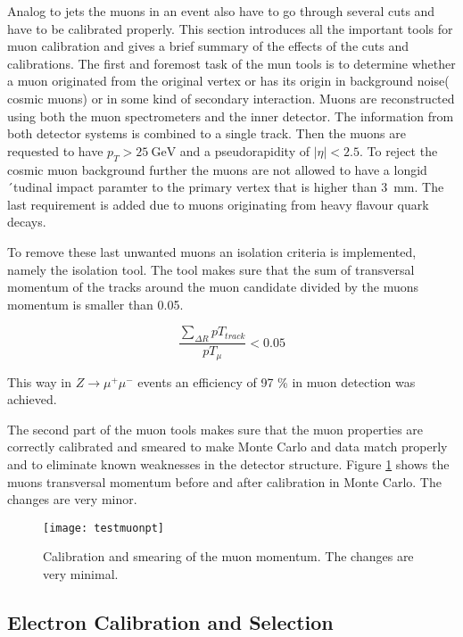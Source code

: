 Analog to jets the muons in an event also have to go through several cuts and have to be calibrated properly. This section introduces all the important tools for muon calibration and gives a brief summary of the effects of the cuts and calibrations.
The first and foremost task of the mun tools is to determine whether a muon originated from the original vertex or has its origin in background noise( cosmic muons) or in some kind of secondary interaction. Muons are reconstructed using both the muon spectrometers and the inner detector. The information from both detector systems is combined to a single track. Then the muons are requested to have $p_T > \SI{25}{\GeV}$ and a pseudorapidity of $|\eta| < \num{2.5}$. To reject the cosmic muon background further the muons are not allowed to have a longid´tudinal impact paramter to the primary vertex that is higher than \SI{3}{\mm}. The last requirement is added due to muons originating from heavy flavour quark decays. 

To remove these last unwanted muons an isolation criteria is implemented, namely the isolation tool. The tool makes sure that the sum of transversal momentum of the tracks around the muon candidate divided by the muons momentum is smaller than \num{0.05}. 

\begin{equation}
\frac{\sum_{\Delta R}pT_{track}}{pT_{\mu}} < 0.05
\end{equation}

This way in $Z \rightarrow \mu^+ \mu^-$ events an efficiency of \num{97} \% in muon detection was achieved.

The second part of the muon tools makes sure that the muon properties are correctly calibrated and smeared to make Monte Carlo and data match properly and to eliminate known weaknesses in the detector structure. Figure \ref{fig:testmuonpt} shows the muons transversal momentum before and after calibration in Monte Carlo. The changes are very minor.

\begin{figure}[h]
\centering
\texttt{[image: testmuonpt]}
\caption{Calibration and smearing of the muon momentum. The changes are very minimal.}
\label{fig:testmuonpt}
\end{figure}

\subsection{Electron Calibration and Selection}

